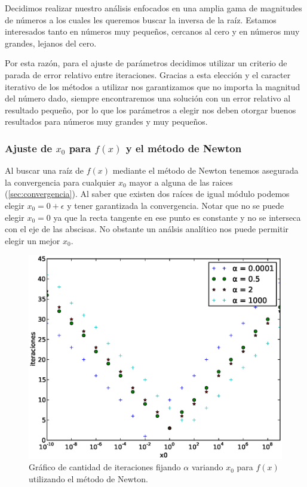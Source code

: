 Decidimos realizar nuestro análisis enfocados en una amplia gama de magnitudes
de números a los cuales les queremos buscar la inversa de la raíz. Estamos
interesados tanto en números muy pequeños, cercanos al cero y en números muy
grandes, lejanos del cero.

Por esta razón, para el ajuste de parámetros decidimos utilizar un criterio de
parada de error relativo entre iteraciones. Gracias a esta elección y el
caracter iterativo de los métodos a utilizar nos garantizamos que no importa la
magnitud del número dado, siempre encontraremos una solución con un error
relativo al resultado pequeño, por lo que los parámetros a elegir nos deben
otorgar buenos resultados para números muy grandes y muy pequeños.

\subsubsection{Ajuste de $x_0$ para $f(x)$ y el método de Newton}
\label{ssub:ajuste_f_x0_newton}

Al buscar una raíz de $f(x)$ mediante el método de Newton tenemos asegurada la
convergencia para cualquier $x_0$ mayor a alguna de las raices
(\ref{sec:convergencia}). Al saber que existen dos raíces de igual módulo
podemos elegir $x_0 = 0 + \epsilon$ y tener garantizada la convergencia. Notar
que no se puede elegir $x_0 = 0$ ya que la recta tangente en ese punto es
constante y no se interseca con el eje de las abscisas. No obstante un análsis
analítico nos puede permitir elegir un mejor $x_0$.

\begin{figure}[!htbp]
  \begin{center}
    \includegraphics[scale=0.5]{graficos/new/f_newton_x0_variable.eps}
    \caption{\label{fig:f_newton_x0_variable} Gráfico de cantidad de iteraciones fijando $\alpha$ variando $x_0$ para $f(x)$ utilizando el método de Newton.}
  \end{center}
\end{figure}


